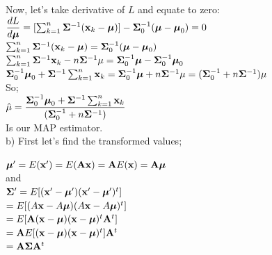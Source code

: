 \documentclass[12pt]{article}
\begin{document}
Now, let's take derivative of $L$ and equate to zero:\\

$ \dfrac{dL}{d\boldsymbol\mu}  = [\sum_{k=1}^n \bold \Sigma^{-1}(\bold x_k-\boldsymbol\mu)]-\bold\Sigma_0^{-1}(\boldsymbol\mu-\boldsymbol\mu_0) = 0$\\

$ \sum_{k=1}^n \bold \Sigma^{-1}(\bold x_k-\boldsymbol\mu)=\bold\Sigma_0^{-1}(\boldsymbol\mu-\boldsymbol\mu_0) $\\

$ \sum_{k=1}^n  \bold \Sigma^{-1}\bold x_k-n\bold \Sigma^{-1}\bold\mu= \bold\Sigma_0^{-1} \boldsymbol\mu-
\bold\Sigma_0^{-1}\boldsymbol\mu_0 $\\

$\bold\Sigma_0^{-1}\boldsymbol\mu_0 + \bold \Sigma^{-1}\sum_{k=1}^n  \bold x_k = \bold\Sigma_0^{-1} \boldsymbol\mu + n\bold \Sigma^{-1}\bold\mu = (\bold\Sigma_0^{-1} + n\bold \Sigma^{-1} ) \bold\mu $\\

So; \\

$\hat{\bold\mu} = \dfrac{\bold\Sigma_0^{-1}\boldsymbol\mu_0 + \bold \Sigma^{-1}\sum_{k=1}^n  \bold x_k }{(\bold\Sigma_0^{-1} + n\bold \Sigma^{-1} ) } $\\

Is our MAP estimator.  \\

b) First let's find the transformed values;

$\boldsymbol\mu'=E(\bold x')=E(\bold A \bold x) = \bold A E(\bold x) = \bold A \boldsymbol\mu$ \\

and \\

$\bold \Sigma' = E[(\bold x' - \boldsymbol \mu') (\bold x' - \boldsymbol \mu')^t] $\\

$= E[(A\bold x - A\boldsymbol \mu) (A\bold x - A\boldsymbol \mu)^t] $\\

$= E[\bold A(\bold x - \boldsymbol \mu) (\bold x - \boldsymbol \mu)^t\bold A^t] $\\

$= \bold AE[(\bold x - \boldsymbol \mu) (\bold x - \boldsymbol \mu)^t]\bold A^t $\\

$= \bold A\bold\Sigma \bold A^t $\\
\end{document}
